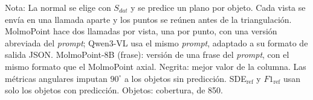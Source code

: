 \begin{table}[htbp]
\vspace{1.5ex}
\begin{minipage}{\wd\tablebox}
\footnotesize
Nota: La normal se elige con $S_{dat}$ y se predice un plano por objeto. Cada vista se envía en una llamada aparte y los puntos se reúnen antes de la triangulación. MolmoPoint hace dos llamadas por vista, una por punto, con una versión abreviada del \textit{prompt}; Qwen3-VL usa el mismo \textit{prompt}, adaptado a su formato de salida JSON. MolmoPoint-8B (frase): versión de una frase del \textit{prompt}, con el mismo formato que el MolmoPoint axial. Negrita: mejor valor de la columna. Las métricas angulares imputan $90^\circ$ a los objetos sin predicción. SDE$_{\mathrm{ref}}$ y $F1_{\mathrm{ref}}$ usan solo los objetos con predicción. Objetos: cobertura, de 850.
\end{minipage}
\end{table}


